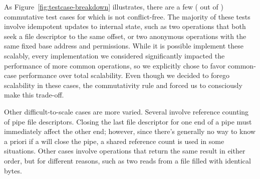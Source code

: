 As Figure~\ref{fig:testcase-breakdown} illustrates, there are a few
( out of )
commutative test cases for
which \fs is not conflict-free.
%
\cbstart
%
The majority of these tests involve idempotent updates to internal
state, such as two  operations that both seek a file
descriptor to the same offset, or two anonymous  operations
with the same fixed base address and permissions.  While it is
possible implement these scalably, every implementation we considered
significantly impacted the performance of more common operations, so
we explicitly chose to favor common-case performance over total
scalability.  Even though we decided to forego scalability in these
cases, the commutativity rule and \tool forced us to consciously make
this trade-off.
%


Other difficult-to-scale cases are more varied.  Several involve
reference counting of pipe file descriptors.  Closing the last file
descriptor for one end of a pipe must immediately affect the other
end; however, since there's generally no way to know a priori if a
 will close the pipe, a shared reference count is used in
some situations.  Other cases involve operations that return the same
result in either order, but for different reasons, such as two reads
from a file filled with identical bytes.



\cbend
